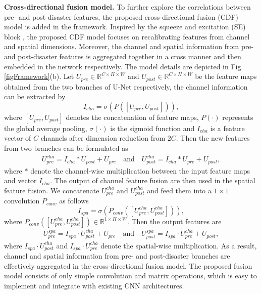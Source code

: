 \documentclass{article}
\begin{document}
\textbf{Cross-directional fusion model.} To further explore the correlations between pre- and post-disaster features, the proposed cross-directional fusion (CDF) model is added in the framework. Inspired by the squeeze and excitation (SE) block \cite{guha2018recalibrating}, the proposed CDF model focuses on recalibrating features from channel and spatial dimensions. 
Moreover, the channel and spatial information from  pre- and post-disaster features is aggregated together in a cross manner and then embedded in the network respectively. The model details are depicted in Fig. \ref{figFramework}(b). Let $U_{pre} \in\mathbb{R}^{C\times H\times W}$ and $U_{post}\in\mathbb{R}^{C\times H\times W}$ be the feature maps obtained from the two branches of U-Net respectively, the channel information can be extracted by
\begin{equation}
I_{cha} = \sigma(P([U_{pre}, U_{post}])), 
\label{eqAverageP}
\end{equation}
where $[U_{pre}, U_{post}]$ denotes the concatenation of feature maps, $P(\cdot)$ represents the global average pooling,  $\sigma(\cdot)$ is the sigmoid function and $I_{cha}$
is a feature vector of $C$ channels after dimension reduction from $2C$. Then the new features from two branches can be formulated as
\begin{equation}
\begin{aligned}
U_{pre}^{cha} = I_{cha}\ast U_{post} + U_{pre}  \quad \textrm{and} \quad
U_{post}^{cha} = I_{cha}\ast U_{pre} + U_{post},
\end{aligned}
\label{eqChannel}
\end{equation}
where $\ast$ denote the channel-wise multiplication between the input feature maps and vector $I_{cha}$. The output of channel feature fusion are then used in the spatial feature fusion. We concatenate $U_{pre}^{cha}$ and $U_{post}^{cha}$ and feed them into a $1\times1$ convolution $P_{conv}$ as follows
\begin{equation}
I_{spa} = \sigma(P_{conv}([U_{pre}^{cha}, U_{post}^{cha}])), 
\label{eqConv1}
\end{equation}
where $P_{conv}([U_{pre}^{cha}, U_{post}^{cha}]) \in \mathbb{R}^{1\times H \times W}$.
Then the output features are 
\begin{equation}
\begin{aligned}
U_{pre}^{spa} = I_{spa}\cdot U_{post}^{cha} + U_{pre}  \quad \textrm{and} \quad
U_{post}^{spa} = I_{spa}\cdot U_{pre}^{cha} + U_{post},
\end{aligned}
\end{equation}
where $I_{spa}\cdot U_{post}^{cha}$ and $I_{spa}\cdot U_{pre}^{cha}$ denote the spatial-wise multiplication. As a result, channel and spatial information from pre- and post-disaster branches are effectively aggregated in the cross-directional fusion model.
The proposed fusion model consists of only simple convolution and matrix operations, which is easy to implement and integrate with existing CNN architectures. 
\end{document}

